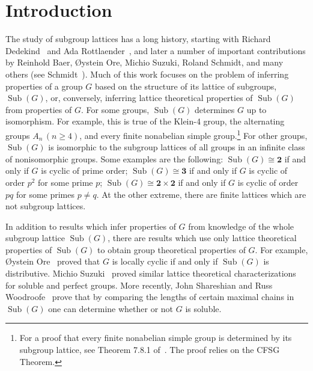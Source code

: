 \documentclass{gen-j-l}
\newcommand{\<}{\ensuremath{\langle}}
\renewcommand{\>}{\ensuremath{\rangle}}
\theoremstyle{plain}
\theoremstyle{definition}
\theoremstyle{remark}
\numberwithin{theorem}{section}
\numberwithin{claim}{section}
\numberwithin{equation}{section}
\numberwithin{conjecture}{section}
\renewcommand{\geq}{\ensuremath{\geqslant}}
\newcommand{\Sub}{\ensuremath{\operatorname{Sub}}}
\newcommand{\2}{\ensuremath{\mathbf{2}}}
\newcommand{\3}{\ensuremath{\mathbf{3}}}
\begin{document}


\section{Introduction}
\label{sec:intro}
The study of subgroup lattices has a long history, starting with 
Richard Dedekind~\cite{Dedekind:1877} 
and 
Ada Rottlaender~\cite{Rottlaender:1928}, and
later a number of important contributions by Reinhold Baer, 
{\O}ystein Ore, 
Michio Suzuki, 
Roland Schmidt, 
and many others (see Schmidt~\cite{Schmidt:1994}).
Much of this work focuses on the problem of inferring
properties of a group $G$ based on the structure of its lattice of subgroups,
$\Sub(G)$,  or, conversely,  inferring lattice theoretical properties of $\Sub(G)$ from properties of
$G$. For some groups, $\Sub(G)$ determines $G$ up to isomorphism.
For example, this is true of the Klein-4 group, the alternating groups
$A_n\, (n\geq 4)$, and every finite nonabelian simple group.\footnote{For a
  proof that every finite nonabelian simple group is determined by its subgroup
  lattice, see Theorem 7.8.1 of~\cite{Schmidt:1994}.  The proof relies on the
 \acs{CFSG} Theorem.} 
For other groups,
$\Sub(G)$ is isomorphic to the subgroup lattices of all groups in an infinite class
of nonisomorphic groups. 
Some examples are the following: $\Sub(G)\cong \2$ if and only if $G$ is cyclic of prime order;
$\Sub(G)\cong \3$ if and only if $G$ is cyclic of order
$p^2$ for some prime $p$; $\Sub(G)\cong \2\times \2$ if and only if $G$ is
cyclic of order $pq$ for some primes $p\neq q$.  At the other extreme, there are
finite lattices which are not subgroup lattices. %

In addition to results which infer properties of $G$ from knowledge of the
whole subgroup lattice $\Sub(G)$, there are results which use only lattice
theoretical properties of $\Sub(G)$ to obtain group theoretical properties of $G$.
For example, {\O}ystein Ore~\cite{Ore:1937,Ore:1938} 
proved that $G$ is locally cyclic if and only if $\Sub(G)$ is
distributive.  Michio Suzuki~\cite{Suzuki:1951} proved similar lattice theoretical
characterizations for soluble and perfect groups. More recently, 
John Shareshian and Russ Woodroofe~\cite{Shareshian:2012} prove that by comparing the lengths of certain maximal
chains in $\Sub(G)$ one can determine whether or not $G$ is soluble.
\end{document}
